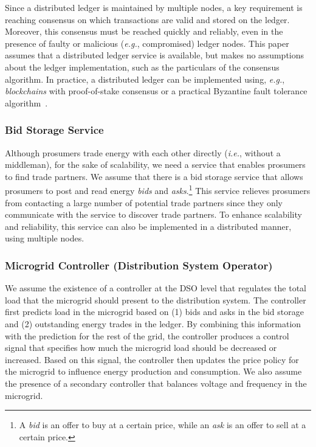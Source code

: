 Since a distributed ledger is maintained by multiple nodes, a key
requirement is reaching consensus on which transactions are valid and
stored on the ledger.  Moreover, this consensus must be reached
quickly and reliably, even in the presence of faulty or malicious
(\emph{e.g.}, compromised) ledger nodes.  This paper assumes that a
distributed ledger service is available, but makes no assumptions
about the ledger implementation, such as the particulars of the
consensus algorithm.  In practice, a distributed ledger can be
implemented using, \emph{e.g.}, \emph{blockchains} with proof-of-stake
consensus or a practical Byzantine fault tolerance
algorithm~\cite{castro1999practical}.

\subsubsection{Bid Storage Service}
Although prosumers trade energy with each other directly (\emph{i.e.},
without a middleman), for the sake of scalability, we need a service
that enables prosumers to find trade partners.  We assume that there
is a bid storage service that allows prosumers to post and read energy
\emph{bids} and \emph{asks}.\footnote{A \emph{bid} is an offer to buy
  at a certain price, while an \emph{ask} is an offer to sell at a
  certain price.}  This service relieves prosumers from contacting a
large number of potential trade partners since they only communicate
with the service to discover trade partners.  To enhance scalability
and reliability, this service can also be implemented in a distributed
manner, using multiple nodes.

\subsubsection{Microgrid Controller (Distribution System Operator)}
We assume the existence of a controller at the DSO level that
regulates the total load that the microgrid should present to the
distribution system.  The controller first predicts load in the
microgrid based on (1) bids and asks in the bid storage and (2)
outstanding energy trades in the ledger.  By combining this
information with the prediction for the rest of the grid, the
controller produces a control signal that specifies how much the
microgrid load should be decreased or increased.  Based on this
signal, the controller then updates the price policy for the microgrid
to influence energy production and consumption.  We also assume the
presence of a secondary controller that balances voltage and frequency
in the microgrid.

